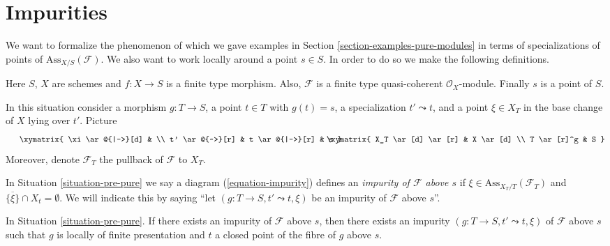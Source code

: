 \section{Impurities}
\label{section-impure}

\noindent
We want to formalize the phenomenon of which we gave examples in
Section \ref{section-examples-pure-modules}
in terms of specializations of points of $\text{Ass}_{X/S}(\mathcal{F})$.
We also want to work locally around a point $s \in S$. In order to do so we
make the following definitions.

\begin{situation}
\label{situation-pre-pure}
Here $S$, $X$ are schemes and $f : X \to S$ is a finite type morphism.
Also, $\mathcal{F}$ is a finite type quasi-coherent $\mathcal{O}_X$-module.
Finally $s$ is a point of $S$.
\end{situation}

\noindent
In this situation consider a morphism $g : T \to S$, a point $t \in T$
with $g(t) = s$, a specialization $t' \leadsto t$, and a point
$\xi \in X_T$ in the base change of $X$ lying over $t'$. Picture
\begin{equation}
\label{equation-impurity}
\vcenter{
\xymatrix{
\xi \ar@{|->}[d] & \\
t' \ar@{~>}[r] & t \ar@{|->}[r] & s
}
}
\quad\quad
\vcenter{
\xymatrix{
X_T \ar[d] \ar[r] & X \ar[d] \\
T \ar[r]^g & S
}
}
\end{equation}
Moreover, denote $\mathcal{F}_T$ the pullback of $\mathcal{F}$ to $X_T$.

\begin{definition}
\label{definition-impurity}
In
Situation \ref{situation-pre-pure}
we say a diagram (\ref{equation-impurity}) defines an
{\it impurity of $\mathcal{F}$ above $s$}
if $\xi \in \text{Ass}_{X_T/T}(\mathcal{F}_T)$ and
$\overline{\{\xi\}} \cap X_t = \emptyset$. We will indicate
this by saying ``let $(g : T \to S, t' \leadsto t, \xi)$ be
an impurity of $\mathcal{F}$ above $s$''.
\end{definition}

\begin{lemma}
\label{lemma-impure-finite-presentation}
In Situation \ref{situation-pre-pure}.
If there exists an impurity of $\mathcal{F}$ above $s$, then
there exists an impurity $(g : T \to S, t' \leadsto t, \xi)$
of $\mathcal{F}$ above $s$ such that $g$ is locally of finite
presentation and $t$ a closed point of the fibre of $g$ above $s$.
\end{lemma}

